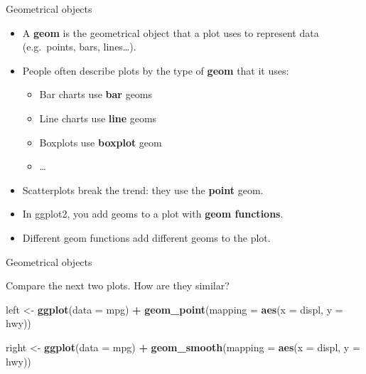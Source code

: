 \documentclass[ignorenonframetext,]{beamer}
\newenvironment{Shaded}{\begin{snugshade}}{\end{snugshade}}
\newcommand{\DataTypeTok}[1]{\textcolor[rgb]{0.13,0.29,0.53}{#1}}
\newcommand{\KeywordTok}[1]{\textcolor[rgb]{0.13,0.29,0.53}{\textbf{#1}}}
\newcommand{\NormalTok}[1]{#1}
\newcommand{\OperatorTok}[1]{\textcolor[rgb]{0.81,0.36,0.00}{\textbf{#1}}}
\newcommand{\StringTok}[1]{\textcolor[rgb]{0.31,0.60,0.02}{#1}}
\providecommand{\tightlist}{%
  \setlength{\itemsep}{0pt}\setlength{\parskip}{0pt}}
\begin{document}
\begin{frame}{Geometrical objects}
\protect\hypertarget{geometrical-objects}{}

\begin{itemize}
\item
  A \textbf{geom} is the geometrical object that a plot uses to
  represent data (e.g.~points, bars, lines\ldots{}).
\item
  People often describe plots by the type of \textbf{geom} that it uses:

  \begin{itemize}
  \tightlist
  \item
    Bar charts use \textbf{bar} geoms
  \item
    Line charts use \textbf{line} geoms
  \item
    Boxplots use \textbf{boxplot} geom
  \item
    \ldots{}
  \end{itemize}
\item
  Scatterplots break the trend: they use the \textbf{point} geom.
\item
  In ggplot2, you add geoms to a plot with \textbf{geom functions}.
\item
  Different geom functions add different geoms to the plot.
\end{itemize}

\end{frame}

\begin{frame}[fragile]{Geometrical objects}
\protect\hypertarget{geometrical-objects-1}{}

Compare the next two plots. How are they similar?

\begin{Shaded}
\begin{Highlighting}[]
\NormalTok{left <-}\StringTok{ }\KeywordTok{ggplot}\NormalTok{(}\DataTypeTok{data =}\NormalTok{ mpg) }\OperatorTok{+}\StringTok{ }
\StringTok{  }\KeywordTok{geom_point}\NormalTok{(}\DataTypeTok{mapping =} \KeywordTok{aes}\NormalTok{(}\DataTypeTok{x =}\NormalTok{ displ, }\DataTypeTok{y =}\NormalTok{ hwy))}

\NormalTok{right <-}\StringTok{ }\KeywordTok{ggplot}\NormalTok{(}\DataTypeTok{data =}\NormalTok{ mpg) }\OperatorTok{+}\StringTok{ }
\StringTok{  }\KeywordTok{geom_smooth}\NormalTok{(}\DataTypeTok{mapping =} \KeywordTok{aes}\NormalTok{(}\DataTypeTok{x =}\NormalTok{ displ, }\DataTypeTok{y =}\NormalTok{ hwy))}
\end{Highlighting}
\end{Shaded}

\end{frame}
\end{document}
